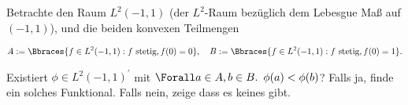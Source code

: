 \begin{exercise}

Betrachte den Raum $L^2(-1, 1)$ (der $L^2$-Raum bezüglich dem Lebesgue Maß auf $(-1, 1)$), und die beiden konvexen Teilmengen

\begin{align*}
  A :=
  \Bbraces{
    f \in L^2(-1, 1):
    f \text{ stetig}, f(0) = 0
  },
  \quad
  B :=
  \Bbraces{
    f \in L^2(-1, 1):
    f \text{ stetig}, f(0) = 1
  }.
\end{align*}

Existiert $\phi \in L^2(-1, 1)^\prime$ mit $\Forall a \in A, b \in B. \enspace \phi(a) < \phi(b)$?
Falls ja, finde ein solches Funktional.
Falls nein, zeige dass es keines gibt.

\end{exercise}

